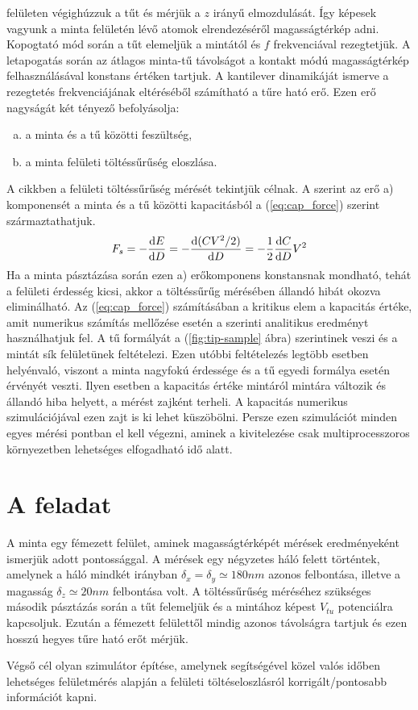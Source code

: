 	felületen végighúzzuk a tűt és mérjük a $z$ irányű elmozdulását. Így képesek vagyunk a minta
	felületén lévő atomok elrendezéséről magasságtérkép adni.
	Kopogtató mód \cite{Martin1987} során a tűt elemeljük a mintától és $f$ frekvenciával rezegtetjük.
	A letapogatás során az  átlagos minta-tű távolságot a kontakt módú magasságtérkép felhasználásával
	konstans értéken tartjuk.
	A kantilever dinamikáját ismerve a rezegtetés frekvenciájának eltéréséből
	számítható a tűre ható erő. Ezen erő nagyságát két tényező befolyásolja:
	\begin{enumerate}[a)]
		\item a minta és a tű közötti feszültség,
		\item a minta felületi töltéssűrűség eloszlása.
	\end{enumerate}
	A cikkben a felületi töltéssűrűség mérését tekintjük célnak.
	A \cite{Butt1991Dec, Butt20051} szerint az erő a) komponensét a minta és a tű közötti
	kapacitásból a (\ref{eq:cap_force}) szerint származtathatjuk.
	\begin{equation}
	\label{eq:cap_force}
	F_{s} = -\frac{\ud E}{\ud D} = -\frac{\ud (CV^2 /2)}{\ud D} = -\frac12 \frac{\ud C}{\ud D} V^2
	\end{equation}
	Ha a minta pásztázása során ezen a) erőkomponens konstansnak mondható, tehát a felületi
	érdesség kicsi, akkor a töltéssűrűg mérésében állandó hibát okozva eliminálható.
	Az (\ref{eq:cap_force}) számításában a kritikus elem a kapacitás értéke, amit numerikus számítás
	mellőzése esetén a \cite{Hudlet1998} szerinti analitikus eredményt használhatjuk fel.
	A tű formályát a (\ref{fig:tip-sample} ábra) szerintinek veszi és a mintát sík felületünek
	feltételezi.
	Ezen utóbbi feltételezés legtöbb esetben helyénvaló, viszont a minta nagyfokú érdessége és a
	tű egyedi formálya esetén érvényét veszti. Ilyen esetben a kapacitás értéke mintáról
	mintára változik és állandó hiba helyett, a mérést zajként terheli.
	A kapacitás numerikus szimulációjával ezen zajt is ki lehet küszöbölni.
	Persze ezen szimulációt minden egyes mérési pontban el kell végezni, aminek a kivitelezése
	csak multiprocesszoros környezetben lehetséges elfogadható idő alatt.
	
\section{A feladat} \label{sec:feladat}
	A minta egy fémezett felület, aminek magasságtérképét mérések eredményeként ismerjük
	adott pontossággal.
	A mérések egy négyzetes háló felett történtek, amelynek a háló mindkét irányban
	$\delta_x = \delta_y \simeq 180 nm$ azonos felbontása, illetve a magasság $\delta_z \simeq 20nm$
	felbontása volt.
	A töltéssűrűség méréséhez szükséges második pásztázás során a tűt felemeljük és a mintához képest
	$V_{tu}$ potenciálra kapcsoljuk. Ezután a fémezett felülettől mindig azonos távolságra tartjuk és ezen 
	hosszú hegyes tűre ható erőt mérjük.
	\noindent
	\begin{center}
	Végső cél olyan szimulátor építése, amelynek segítségével közel valós időben 
	lehetséges felületmérés alapján a felületi töltéseloszlásról korrigált/pontosabb információt
	kapni.
	\end{center}
	
